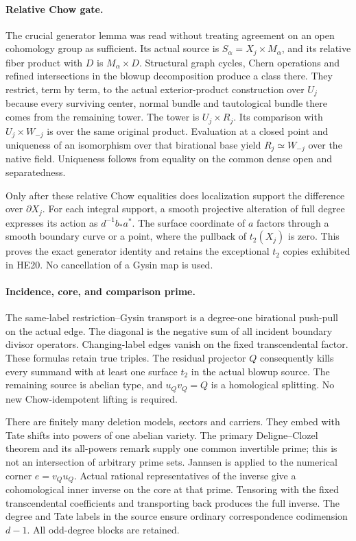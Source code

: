 \paragraph{Relative Chow gate.}
The crucial generator lemma was read without treating agreement on an
open cohomology group as sufficient. Its actual source is
$S_\alpha=X_j\times M_\alpha$, and its relative fiber product with $D$
is $M_\alpha\times D$. Structural graph cycles, Chern operations and
refined intersections in the blowup decomposition produce a class
there. They restrict, term by term, to the actual exterior-product
construction over $U_j$ because every surviving center, normal bundle
and tautological bundle there comes from the remaining tower.
The tower is $U_j\times R_j$. Its comparison with
$U_j\times W_{-j}$ is over the same original product. Evaluation at a
closed point and uniqueness of an isomorphism over that birational
base yield $R_j\simeq W_{-j}$ over the native field. Uniqueness follows
from equality on the common dense open and separatedness.

Only after these relative Chow equalities does localization support
the difference over $\partial X_j$. For each integral support, a smooth
projective alteration of full degree expresses its action as
$d^{-1}b_*a^*$. The surface coordinate of $a$ factors through a smooth
boundary curve or a point, where the pullback of $t_2(X_j)$ is zero.
This proves the exact generator identity and retains the exceptional
$t_2$ copies exhibited in HE20. No cancellation of a Gysin map is used.

\paragraph{Incidence, core, and comparison prime.}
The same-label restriction--Gysin transport is a degree-one birational
push-pull on the actual edge. The diagonal is the negative sum of all
incident boundary divisor operators. Changing-label edges vanish on
the fixed transcendental factor. These formulas retain true triples.
The residual projector $Q$ consequently kills every summand with at
least one surface $t_2$ in the actual blowup source. The remaining source
is abelian type, and $u_Qv_Q=Q$ is a homological splitting. No new
Chow-idempotent lifting is required.

There are finitely many deletion models, sectors and carriers. They
embed with Tate shifts into powers of one abelian variety. The primary
Deligne--Clozel theorem and its all-powers remark supply one common
invertible prime; this is not an intersection of arbitrary prime sets.
Jannsen is applied to the numerical corner $e=v_Qu_Q$. Actual rational
representatives of the inverse give a cohomological inner inverse on
the core at that prime. Tensoring with the fixed transcendental
coefficients and transporting back produces the full inverse. The
degree and Tate labels in the source ensure ordinary correspondence
codimension $d-1$. All odd-degree blocks are retained.

